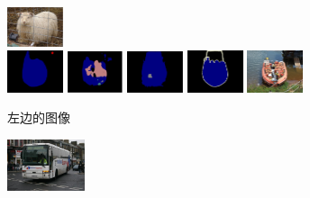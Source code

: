 \begin{figure}[h!]
\begin{subfigure}{0.55\textwidth}
		\includegraphics[width=0.18\textwidth]{image/chap04/result/compare/im_sheep.pdf}
		\\
		\includegraphics[width=0.18\textwidth]{image/chap04/result/compare/my_boat.png}
		\includegraphics[width=0.18\textwidth]{image/chap04/result/compare/fcn_boat.png}
		\includegraphics[width=0.18\textwidth]{image/chap04/result/compare/sds_boat.png}
		\includegraphics[width=0.18\textwidth]{image/chap04/result/compare/2007_004241.png}
		\includegraphics[width=0.18\textwidth]{image/chap04/result/compare/2007_004241.jpg}
		\caption{左边的图像}
		\label{fig:compare1}
	\end{subfigure}
	\begin{subfigure}{0.4\textwidth}
		\centering
		\includegraphics[width=0.25\textwidth]{image/chap04/result/compare/2010_005284.jpg}

\end{subfigure}
\end{figure}
